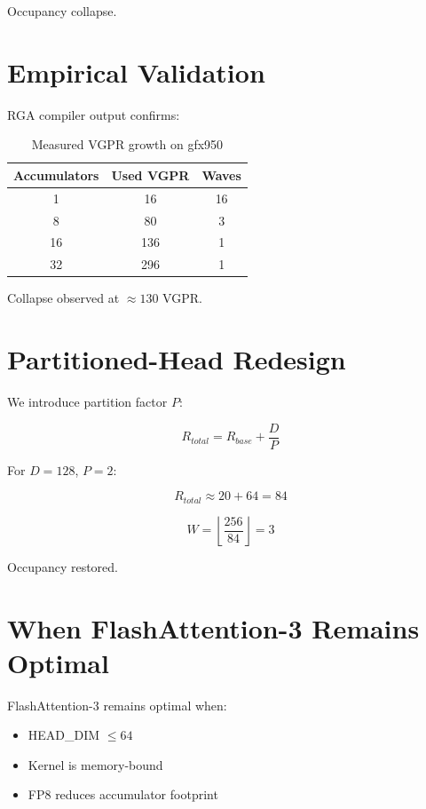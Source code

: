 \documentclass[conference]{IEEEtran}
\begin{document}
Occupancy collapse.

\section{Empirical Validation}

RGA compiler output confirms:

\begin{table}[h]
\centering
\begin{tabular}{ccc}
\toprule
Accumulators & Used VGPR & Waves \\
\midrule
1 & 16 & 16 \\
8 & 80 & 3 \\
16 & 136 & 1 \\
32 & 296 & 1 \\
\bottomrule
\end{tabular}
\caption{Measured VGPR growth on gfx950}
\end{table}

Collapse observed at $\approx 130$ VGPR.

\section{Partitioned-Head Redesign}

We introduce partition factor $P$:

\begin{equation}
R_{total} = R_{base} + \frac{D}{P}
\end{equation}

For $D=128$, $P=2$:

\begin{equation}
R_{total} \approx 20 + 64 = 84
\end{equation}

\begin{equation}
W = \left\lfloor \frac{256}{84} \right\rfloor = 3
\end{equation}

Occupancy restored.

\section{When FlashAttention-3 Remains Optimal}

FlashAttention-3 \cite{dao2024flash3} remains optimal when:

\begin{itemize}
\item HEAD\_DIM $\le 64$
\item Kernel is memory-bound
\item FP8 reduces accumulator footprint
\end{itemize}
\end{document}
